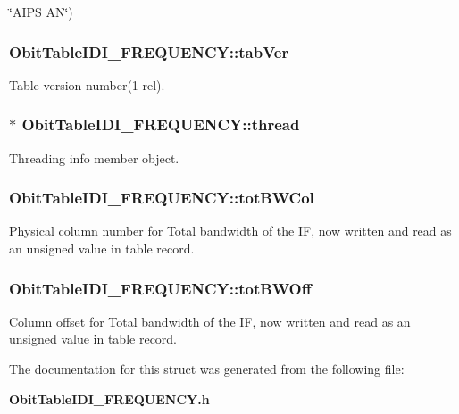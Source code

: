 \char`\"{}AIPS AN\char`\"{}) 
\subsubsection{ {\bf Obit\-Table\-IDI\_\-FREQUENCY::tab\-Ver}}\label{structObitTableIDI__FREQUENCY_o13}


Table version number(1-rel). 

\subsubsection{$\ast$ {\bf Obit\-Table\-IDI\_\-FREQUENCY::thread}}\label{structObitTableIDI__FREQUENCY_o4}


Threading info member object. 

\subsubsection{ {\bf Obit\-Table\-IDI\_\-FREQUENCY::tot\-BWCol}}\label{structObitTableIDI__FREQUENCY_o33}


Physical column number for Total bandwidth of the IF, now written and read as an unsigned value in table record. 

\subsubsection{ {\bf Obit\-Table\-IDI\_\-FREQUENCY::tot\-BWOff}}\label{structObitTableIDI__FREQUENCY_o32}


Column offset for Total bandwidth of the IF, now written and read as an unsigned value in table record. 



The documentation for this struct was generated from the following file:\begin{CompactItemize}
\item 
{\bf Obit\-Table\-IDI\_\-FREQUENCY.h}\end{CompactItemize}
